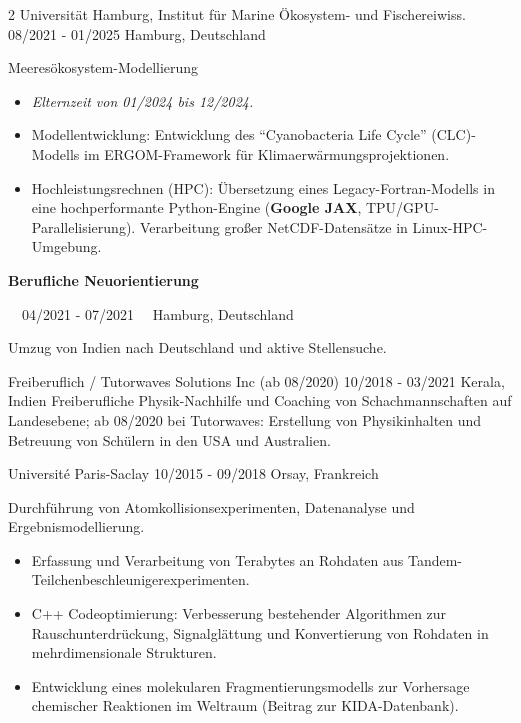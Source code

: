 \documentclass{thejus_cv}
\begin{document}
\begin{paracol}{2}
             {Universit\"at Hamburg, Institut f\"ur Marine \"Okosystem- und Fischereiwiss.}
             {08/2021 - 01/2025}
             {Hamburg, Deutschland}
             {Meeres\"okosystem-Modellierung
             \begin{itemize}\setlength{\itemsep}{0.05em}
                 \item \textit{Elternzeit von 01/2024 bis 12/2024.}
                 \item Modellentwicklung: Entwicklung des ``Cyanobacteria Life Cycle'' (CLC)-Modells im ERGOM-Framework f\"ur Klimaerw\"armungsprojektionen.
                 \item Hochleistungsrechnen (HPC): \"Ubersetzung eines Legacy-Fortran-Modells in eine hochperformante Python-Engine (\textbf{Google JAX}, TPU/GPU-Parallelisierung). Verarbeitung gro{\ss}er NetCDF-Datens\"atze in Linux-HPC-Umgebung.
             \end{itemize}}

{\large\textbf{Berufliche Neuorientierung}}\par
{\small\color{cvgray}\faCalendar\ \ 04/2021 - 07/2021 \hspace{0.5cm} \faMapMarker\ \ Hamburg, Deutschland}\par
\vspace{0.2em}
{\color{cvlightgray}\hdashrule{\linewidth}{0.5pt}{1mm}}\par
\vspace{0.2em}
Umzug von Indien nach Deutschland und aktive Stellensuche.
\vspace{0.3em}

             {Freiberuflich / Tutorwaves Solutions Inc (ab 08/2020)}
             {10/2018 - 03/2021}
             {Kerala, Indien}
             {Freiberufliche Physik-Nachhilfe und Coaching von Schachmannschaften auf Landesebene; ab 08/2020 bei Tutorwaves: Erstellung von Physikinhalten und Betreuung von Sch\"ulern in den USA und Australien.}

             {Universit\'e Paris-Saclay}
             {10/2015 - 09/2018}
             {Orsay, Frankreich}
             {Durchf\"uhrung von Atomkollisionsexperimenten, Datenanalyse und Ergebnismodellierung.
             \begin{itemize}
                 \item Erfassung und Verarbeitung von Terabytes an Rohdaten aus Tandem-Teilchenbeschleunigerexperimenten.
                 \item C++ Codeoptimierung: Verbesserung bestehender Algorithmen zur Rauschunterdr\"uckung, Signalgl\"attung und Konvertierung von Rohdaten in mehrdimensionale Strukturen.
                 \item Entwicklung eines molekularen Fragmentierungsmodells zur Vorhersage chemischer Reaktionen im Weltraum (Beitrag zur KIDA-Datenbank).
             \end{itemize}}





\end{paracol}
\end{document}
